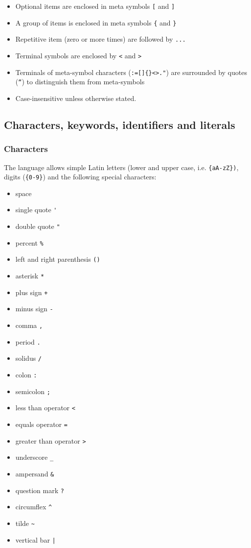 \documentclass[11pt,a4paper]{ivoa}
\begin{document}
\begin{itemize}
    \item Optional items are enclosed in meta symbols \verb:[: and \verb:]:
    \item A group of items is enclosed in meta symbols \verb:{: and \verb:}:
    \item Repetitive item (zero or more times) are followed by \verb:...:
    \item Terminal symbols are enclosed by \verb:<: and \verb:>:
    \item Terminals of meta-symbol characters (\verb!:=[]{}<>."!) are surrounded by quotes (\verb:“:) to distinguish them from meta-symbols
    \item Case-insensitive unless otherwise stated.
\end{itemize}


\subsection{Characters, keywords, identifiers and literals}
\subsubsection{Characters}
\label{sec:characters}

The language allows simple Latin letters (lower and upper case, i.e.
\verb:{aA-zZ}):, digits (\verb:{0-9}:) and the following special characters:

\begin{itemize}
    \item space
    \item single quote \verb:':
    \item double quote \verb:":
    \item percent \verb:%:
    \item left and right parenthesis \verb:():
    \item asterisk \verb:*:
    \item plus sign \verb:+:
    \item minus sign \verb:-:
    \item comma \verb:,:
    \item period \verb:.:
    \item solidus \verb:/:
    \item colon \verb.:.
    \item semicolon \verb:;:
    \item less than operator \verb:<:
    \item equals operator \verb:=:
    \item greater than operator \verb:>:
    \item underscore \verb:_:
    \item ampersand \verb:&:
    \item question mark \verb:?:
    \item circumflex \verb:^:
    \item tilde \verb:~:
    \item vertical bar \verb:|:
\end{itemize}
\end{document}
